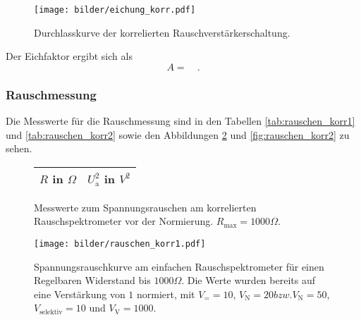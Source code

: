 		\begin{figure}
			\centering
			\texttt{[image: bilder/eichung\_korr.pdf]}
			\caption{Durchlasskurve der korrelierten Rauschverstärkerschaltung.}
			\label{fig:eichung_korr}
		\end{figure}
		
		Der Eichfaktor ergibt sich als
		\begin{equation}
			A =    \quad .  
		\end{equation}


	\clearpage
	\subsubsection{Rauschmessung}
		Die Messwerte für die Rauschmessung sind in den Tabellen \ref{tab:rauschen_korr1} 
		und \ref{tab:rauschen_korr2} sowie den Abbildungen 
		\ref{fig:rauschen_korr1} und \ref{fig:rauschen_korr2} zu sehen.
		
		
	\begin{figure}[htbp]

	\begin{minipage}{0.3\textwidth} 

			\centering
			\begin{tabular}{cc}
				\toprule \midrule
				$R$ in $\Omega$ & $U_\text{a}^2$ in $V^2$ \\
				\midrule
							
				\midrule \bottomrule
			\end{tabular}
			\caption{Messwerte zum Spannungsrauschen am korrelierten 
			Rauschspektrometer vor der Normierung. $R_\text{max}=1000 \Omega$.}
			\label{tab:rauschen_korr1}

	\end{minipage}
	
	\hfill
	
	\begin{minipage}{0.6\textwidth}

			\centering
			\texttt{[image: bilder/rauschen\_korr1.pdf]}
			\caption{Spannungsrauschkurve am einfachen Rauschspektrometer für einen 
			Regelbaren Widerstand bis $1000\Omega$. Die Werte wurden bereits auf eine Verstärkung von 
			$1$ normiert, mit $V_= =10$, $V_\text{N}=20 bzw. V_\text{N}=50$, 
			$V_\text{selektiv}=10$ und $V_\text{V}=1000$. }
			\label{fig:rauschen_korr1}
			
	\end{minipage}

	\end{figure}		
	
